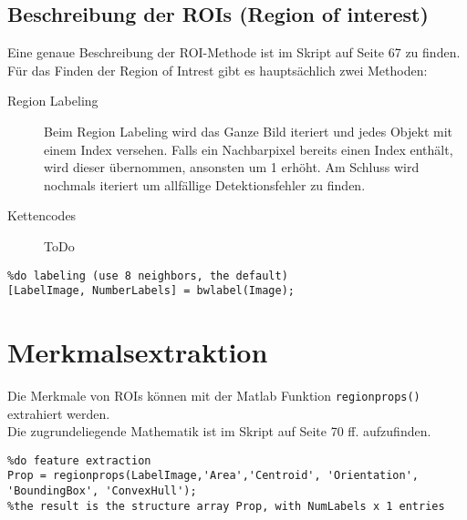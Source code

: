 \subsection{Beschreibung der ROIs (Region of interest)}
Eine genaue Beschreibung der ROI-Methode ist im Skript auf Seite 67 zu finden.\\
Für das Finden der Region of Intrest gibt es hauptsächlich zwei Methoden:
\begin{description}
    \item[Region Labeling] Beim Region Labeling wird das Ganze Bild iteriert und jedes Objekt mit einem Index versehen. Falls ein Nachbarpixel bereits einen Index enthält, wird dieser übernommen, ansonsten um 1 erhöht. Am Schluss wird nochmals iteriert um allfällige Detektionsfehler zu finden.
    \item[Kettencodes] ToDo
\end{description}
\begin{lstlisting}
%do labeling (use 8 neighbors, the default)
[LabelImage, NumberLabels] = bwlabel(Image);
\end{lstlisting}

\section{Merkmalsextraktion}
Die Merkmale von ROIs können mit der Matlab Funktion \lstinline|regionprops()| extrahiert werden.\\
Die zugrundeliegende Mathematik ist im Skript auf Seite 70 ff. aufzufinden.
\begin{lstlisting}
%do feature extraction 
Prop = regionprops(LabelImage,'Area','Centroid', 'Orientation', 'BoundingBox', 'ConvexHull');
%the result is the structure array Prop, with NumLabels x 1 entries
\end{lstlisting}

